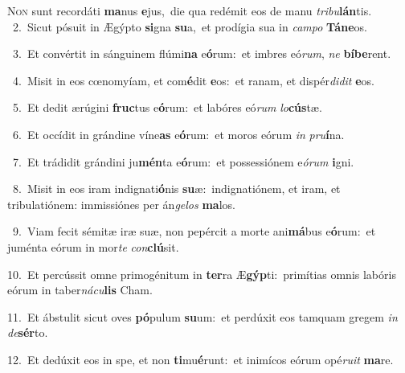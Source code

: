 \lettrine{\initial\textcolor{\initialcolor}{N}}{on} sunt recordáti \textbf{ma}\-nus \textbf{e}\-jus,~\star die qua redémit eos de manu \textit{tri}\-\textit{bu}\textbf{lán}tis.\\
{\numbfont\textcolor{\numbcolor}{~2.}}~Sicut pósuit in Ægýpto \textbf{si}\-gna \textbf{su}\-a,~\star et prodígia sua in \textit{cam}\-\textit{po} \textbf{Tá}\-\textbf{ne}os.\par
{\numbfont\textcolor{\numbcolor}{~3.}}~Et convértit in sánguinem flúmi\textbf{na} e\-\textbf{ó}\-rum:~\star et imbres eó\-\textit{rum}\-, \textit{ne} \textbf{bí}\-\textbf{be}rent.\par
{\numbfont\textcolor{\numbcolor}{~4.}}~Misit in eos cœnomyíam, et com\-\textbf{é}\-dit \textbf{e}\-os:~\star et ranam, et dispér\-\textit{di}\-\textit{dit} \textbf{e}\-os.\par
{\numbfont\textcolor{\numbcolor}{~5.}}~Et dedit ærúgini \textbf{fruc}\-tus e\-\textbf{ó}\-rum:~\star et labóres eó\textit{rum} \textit{lo}\-\textbf{cús}tæ.\par
{\numbfont\textcolor{\numbcolor}{~6.}}~Et occídit in grándine víne\textbf{as} e\-\textbf{ó}\-rum:~\star et moros eórum \textit{in} \textit{pru}\-\textbf{í}na.\par
{\numbfont\textcolor{\numbcolor}{~7.}}~Et trádidit grándini ju\-\textbf{mén}\-ta e\-\textbf{ó}\-rum:~\star et possessiónem e\-\textit{ó}\-\textit{rum} \textbf{i}\-gni.\par
{\numbfont\textcolor{\numbcolor}{~8.}}~Misit in eos iram indignati\-\textbf{ó}\-nis \textbf{su}\-æ:~\star indignatiónem, et iram, et tribulatiónem: immissiónes per án\-\textit{ge}\-\textit{los} \textbf{ma}\-los.\par
{\numbfont\textcolor{\numbcolor}{~9.}}~Viam fecit sémitæ iræ suæ, non pepércit a morte ani\-\textbf{má}\-bus e\-\textbf{ó}\-rum:~\star et juménta eórum in mor\textit{te} \textit{con}\-\textbf{clú}sit.\par
{\numbfont\textcolor{\numbcolor}{10.}}~Et percússit omne primogénitum in \textbf{ter}\-ra Æ\-\textbf{gýp}\-ti:~\star primítias omnis labóris eórum in taber\-\textit{ná}\-\textit{cu}\textbf{lis} Cham.\par
{\numbfont\textcolor{\numbcolor}{11.}}~Et ábstulit sicut oves \textbf{pó}\-pulum \textbf{su}\-um:~\star et perdúxit eos tamquam gregem \textit{in} \textit{de}\-\textbf{sér}to.\par
{\numbfont\textcolor{\numbcolor}{12.}}~Et dedúxit eos in spe, et non \textbf{ti}\-mu\-\textbf{é}\-runt:~\star et inimícos eórum opé\-\textit{ru}\-\textit{it} \textbf{ma}\-re.\par
